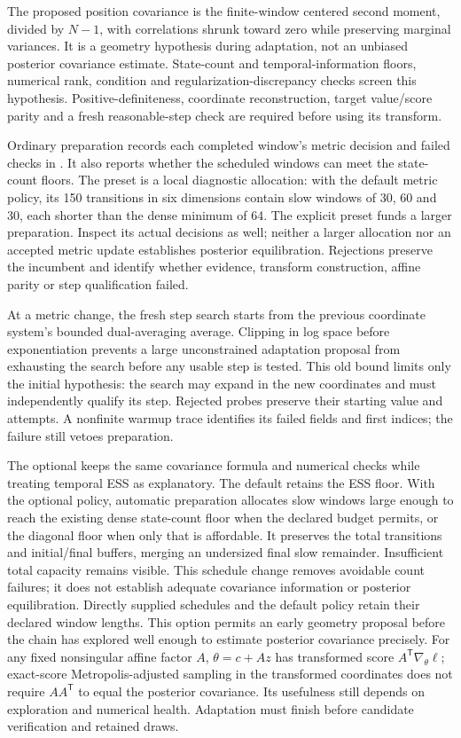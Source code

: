 The proposed position covariance is the finite-window centered second moment,
divided by $N-1$, with correlations shrunk toward zero while preserving marginal
variances. It is a geometry hypothesis during adaptation, not an unbiased
posterior covariance estimate. State-count and temporal-information floors,
numerical rank, condition and regularization-discrepancy checks screen this
hypothesis. Positive-definiteness, coordinate reconstruction, target value/score
parity and a fresh reasonable-step check are required before using its transform.

Ordinary preparation records each completed window's metric decision and failed
checks in . It also reports whether the scheduled
windows can meet the state-count floors. The  preset is a local
diagnostic allocation: with the default metric policy, its 150 transitions in six dimensions contain slow
windows of 30, 60 and 30, each shorter than the dense minimum of 64. The explicit
 preset funds a larger preparation. Inspect its actual decisions
as well; neither a larger allocation nor an accepted metric update establishes
posterior equilibration. Rejections preserve the incumbent and identify whether
evidence, transform construction, affine parity or step qualification failed.

At a metric change, the fresh step search starts from the previous coordinate
system's bounded dual-averaging average. Clipping in log space before
exponentiation prevents a large unconstrained adaptation proposal from
exhausting the search before any usable step is tested. This old bound limits
only the initial hypothesis: the search may expand in the new coordinates and
must independently qualify its step. Rejected probes preserve their starting
value and attempts. A nonfinite warmup trace identifies its failed fields and
first indices; the failure still vetoes preparation.

The optional  keeps the same
covariance formula and numerical checks while treating temporal ESS as
explanatory. The default  retains the ESS floor.
With the optional policy, automatic preparation allocates slow windows large
enough to reach the existing dense state-count floor when the declared budget
permits, or the diagonal floor when only that is affordable. It preserves the
total transitions and initial/final buffers, merging an undersized final slow
remainder. Insufficient total capacity remains visible. This schedule change
removes avoidable count failures; it does not establish adequate covariance
information or posterior equilibration. Directly supplied schedules and the
default policy retain their declared window lengths.
This option permits an early geometry proposal before the chain has explored
well enough to estimate posterior covariance precisely. For any fixed
nonsingular affine factor $A$, $\theta=c+Az$ has transformed score
$A^{\mathsf T}\nabla_\theta\ell$; exact-score Metropolis-adjusted sampling in
the transformed coordinates does not require $AA^{\mathsf T}$ to equal the
posterior covariance. Its usefulness still depends on exploration and numerical
health. Adaptation must finish before candidate verification and retained draws.

